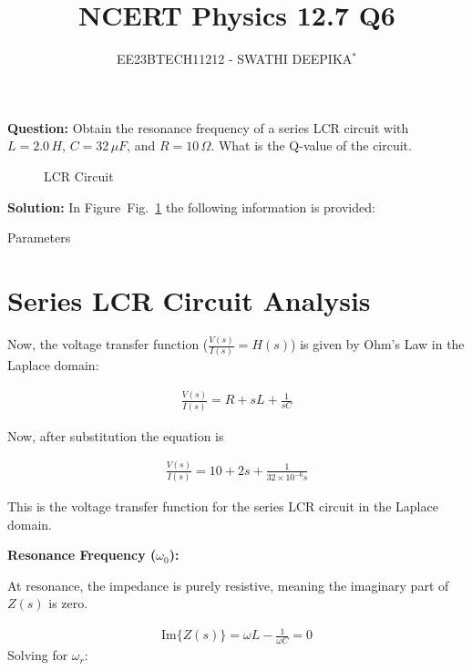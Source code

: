 \documentclass[journal,12pt,twocolumn]{IEEEtran}
\title{
	
\title{NCERT Physics 12.7 Q6}
\author{EE23BTECH11212 - SWATHI DEEPIKA$^{*}$%
}


}
\newcommand\figref{Fig.~\ref}
\theoremstyle{remark}
\begin{document}
\maketitle

\textbf{Question:} 
Obtain the resonance frequency of a series LCR circuit with $L = 2.0\, H$, $C = 32\, \mu F$, and $R = 10\, \Omega$. What is the Q-value of the circuit.\\

\begin{figure}[h]
	\centering
	
	\caption{LCR Circuit}
	\label{fig:2}
\end{figure}
     
\textbf{Solution: }
In Figure~\figref{fig:2} the following information is provided:
 
 

 \begin{table}[h]
 	\centering
 	\resizebox{6 cm}{!}{
 		
 	}
 	\vspace{6 pt}
 	\caption{Parameters}
 	\label{tab:my_label} 
 \end{table}
 

\section*{Series LCR Circuit Analysis}

Now, the voltage transfer function (\(\frac{V(s)}{I(s)} = H(s)\)) is given by Ohm's Law in the Laplace domain:

\begin{align}
\frac{V(s)}{I(s)} = R + sL + \frac{1}{sC} 
\end{align}

Now, after substitution the equation is 

\begin{align}
\frac{V(s)}{I(s)} = 10 + 2s + \frac{1}{32 \times 10^{-6}s}
\end{align}

This is the voltage transfer function for the series LCR circuit in the Laplace domain.

\textbf{Resonance Frequency (\(\omega_0\)):}

At resonance, the impedance is purely resistive, meaning the imaginary part of \(Z(s)\) is zero.

\begin{align}
\text{Im}\{Z(s)\} = \omega L - \frac{1}{\omega C} = 0
\end{align}
Solving for \(\omega_r\):
\end{document}
